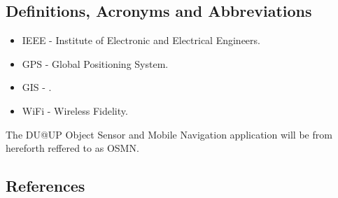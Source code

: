 \documentclass{article}
\begin{document}
	\subsection{Definitions, Acronyms and Abbreviations}
		\begin{itemize}
			\item IEEE - Institute of Electronic and Electrical Engineers.
			\item GPS - Global Positioning System.
			\item GIS - .
			\item WiFi - Wireless Fidelity.
		\end{itemize}
		
		The DU@UP Object Sensor and Mobile Navigation application will be from hereforth reffered to as OSMN.
		
	\subsection{References}
	
\newpage
%
%	
\end{document}
